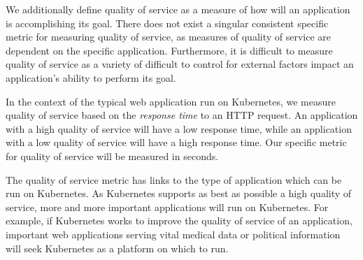 We additionally define quality of service as a measure of how will an application
is accomplishing its goal. There does not exist a singular consistent specific
metric for measuring quality of service, as measures of quality of service are dependent on
the specific application. Furthermore, it is difficult to measure quality of
service as a variety of difficult to control for external factors impact an
application's ability to perform its goal.

In the context of the typical web application run on Kubernetes, we measure
quality of service based on the \textit{response time} to an HTTP request. An application
with a high quality of service will have a low response time, while an
application with a low quality of service will have a high response time. Our
specific metric for quality of service will be measured in seconds.

The quality of service metric has links to the type of application which can be
run on Kubernetes. As Kubernetes supports as best as possible a high quality of
service, more and more important applications will run on Kubernetes. For
example, if Kubernetes works to improve the quality of service of an
application, important web applications serving vital medical data or political
information will seek Kubernetes as a platform on which to run.
